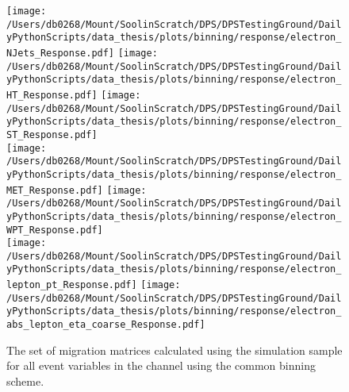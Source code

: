 \begin{figure}[hp]
	\centering
	\texttt{[image: /Users/db0268/Mount/SoolinScratch/DPS/DPSTestingGround/DailyPythonScripts/data\_thesis/plots/binning/response/electron\_NJets\_Response.pdf]}
	\texttt{[image: /Users/db0268/Mount/SoolinScratch/DPS/DPSTestingGround/DailyPythonScripts/data\_thesis/plots/binning/response/electron\_HT\_Response.pdf]}
	\texttt{[image: /Users/db0268/Mount/SoolinScratch/DPS/DPSTestingGround/DailyPythonScripts/data\_thesis/plots/binning/response/electron\_ST\_Response.pdf]}\\
	\texttt{[image: /Users/db0268/Mount/SoolinScratch/DPS/DPSTestingGround/DailyPythonScripts/data\_thesis/plots/binning/response/electron\_MET\_Response.pdf]}
	\texttt{[image: /Users/db0268/Mount/SoolinScratch/DPS/DPSTestingGround/DailyPythonScripts/data\_thesis/plots/binning/response/electron\_WPT\_Response.pdf]} \\
	\texttt{[image: /Users/db0268/Mount/SoolinScratch/DPS/DPSTestingGround/DailyPythonScripts/data\_thesis/plots/binning/response/electron\_lepton\_pt\_Response.pdf]}
	\texttt{[image: /Users/db0268/Mount/SoolinScratch/DPS/DPSTestingGround/DailyPythonScripts/data\_thesis/plots/binning/response/electron\_abs\_lepton\_eta\_coarse\_Response.pdf]}
	\caption[The set of migration matrices calculated using the \powhegpythia{} simulation sample for all event variables in the \eJets{} channel using the common binning scheme.]{The set of migration matrices calculated using the \powhegpythia{} simulation sample for all event variables in the \eJets{} channel using the common binning scheme.}
	\label{fig:ResponseMatricesE}
\end{figure}

